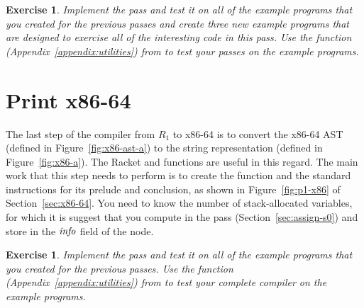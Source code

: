 \documentclass[11pt]{book}
\newtheorem{exercise}[theorem]{Exercise}
\begin{document}
\begin{exercise}
\normalfont
Implement the  pass and test it on all of the
example programs that you created for the previous passes and create
three new example programs that are designed to exercise all of the
interesting code in this pass. Use the  function
(Appendix~\ref{appendix:utilities}) from  to test
your passes on the example programs.
\end{exercise}


\section{Print x86-64}
\label{sec:print-x86}
The last step of the compiler from $R_1$ to x86-64 is to convert the
x86-64 AST (defined in Figure~\ref{fig:x86-ast-a}) to the string
representation (defined in Figure~\ref{fig:x86-a}). The Racket
 and  functions are useful in this
regard. The main work that this step needs to perform is to create the
 function and the standard instructions for its prelude
and conclusion, as shown in Figure~\ref{fig:p1-x86} of
Section~\ref{sec:x86-64}. You need to know the number of
stack-allocated variables, for which it is suggest that you compute in
the  pass (Section~\ref{sec:assign-s0}) and store in
the $\mathit{info}$ field of the  node.

\begin{exercise}
\normalfont Implement the  pass and test it on all of
the example programs that you created for the previous passes. Use the
 function (Appendix~\ref{appendix:utilities}) from
 to test your complete compiler on the example
programs.
\end{exercise}


\end{document}
